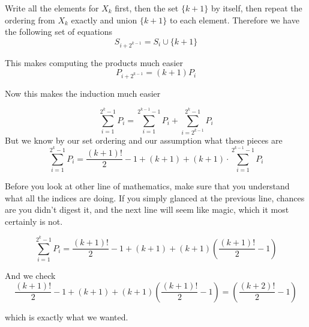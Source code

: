\documentclass{amsart}
\theoremstyle{definition}
\theoremstyle{remark}
\numberwithin{equation}{section}
\begin{document}
Write all the elements for $X_k$ first, then the set $\{k+1\}$ by itself, then repeat the ordering from $X_k$ exactly and union $\{k+1\}$ to each element.  Therefore we have the following set of equations
\[
S_{i+2^{k-1}} = S_i \cup \{k+1\}
\] 

This makes computing the products much easier
\[
P_{i+2^{k-1}} = (k+1)P_i
\]


Now this makes the induction much easier

\[
\sum_{i=1}^{2^k - 1}P_i = \sum_{i=1}^{2^{k-1}-1}P_i + \sum_{i=2^{k-1}}^{2^k-1}P_i
\]
But we know by our set ordering and our assumption what these pieces are
\[
\sum_{i=1}^{2^k-1}P_i = \frac{(k+1)!}{2}-1 + (k+1) + (k+1)\cdot\sum_{i=1}^{2^{k-1}-1}P_i
\]

Before you look at other line of mathematics, make sure that you understand what all the indices are doing.  If you simply glanced at the previous line, chances are you didn't digest it, and the next line will seem like magic, which it most certainly is not.

\[
\sum_{i=1}^{2^k-1}P_i = \frac{(k+1)!}{2}-1 + (k+1) + (k+1)\left(\frac{(k+1)!}{2}-1\right)
\]

And we check
\[
\frac{(k+1)!}{2}-1 + (k+1) + (k+1)\left(\frac{(k+1)!}{2}-1\right) = \left(\frac{(k+2)!}{2}-1\right)
\]

which is exactly what we wanted.
\end{document}
